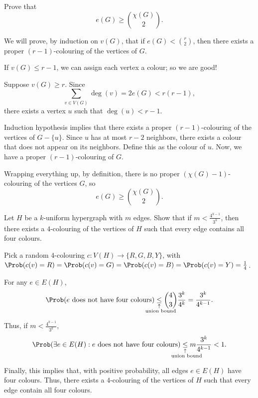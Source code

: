 \documentclass[10pt, a4paper]{article}
\newcommand{\signexpl}[3]{%
  \underset{\substack{\uparrow\\\mathrlap{\text{\hspace{#3}#2}}}}{#1}}
\begin{document}
\newpage
\begin{prob}
	Prove that \[
		e(G) \ge \binom{\chi(G)}{2}.
	\]
\end{prob}
\begin{sol}
	We will prove, by induction on $v(G)$, that if $e(G) < \binom{r}{2}$, then there exists a proper $(r-1)$-colouring of the vertices of $G$.

	If $v(G) \le r-1$, we can assign each vertex a colour; so we are good!

	Suppose $v(G) \ge r$. Since \[\sum_{v \in V(G)}\deg(v) = 2e(G) < r(r-1),\] there exists a vertex $u$ such that $\deg(u) < r-1$.
	
	Induction hypothesis implies that there exists a proper $(r-1)$-colouring of the vertices of $G - \{u\}$. Since $u$ has at most $r-2$ neighbors, there exists a colour that does not appear on its neighbors. Define this as the colour of $u$. Now, we have a proper $(r-1)$-colouring of $G$.

	Wrapping everything up, by definition, there is no proper $(\chi(G) - 1)$-colouring of the vertices $G$, so \[
		e(G) \ge \binom{\chi(G)}{2}.
	\]
\end{sol}

\newpage
\begin{prob}
	Let $H$ be a $k$-uniform hypergraph with $m$ edges. Show that if $m < \frac{4^{k-1}}{3^k}$, then there exists a $4$-colouring of the vertices of $H$ such that every edge contains all four colours.
\end{prob}
\begin{sol}
	Pick a random $4$-colouring $c \colon V(H) \to \{R, G, B, Y\}$, with $\Prob(c(v) = R) = \Prob(c(v) = G) = \Prob(c(v) = B) = \Prob(c(v) = Y) = \frac{1}{4}$.

	For any $e \in E(H)$, \[
		\Prob(e \text{ does not have four colours}) \signexpl{\le}{union bound}{-2.5em} \binom{4}{3} \frac{3^k}{4^k} = \frac{3^k}{4^{k-1}}.
	\]

	Thus, if $m < \frac{4^{k-1}}{3^k}$, \[
		\Prob(\exists e \in E(H) : e \text{ does not have four colours}) \signexpl{\le}{union bound}{-2.5em} m \frac{3^k}{4^{k-1}} < 1.
	\]

	Finally, this implies that, with positive probability, all edges $e \in E(H)$ have four colours. Thus, there exists a $4$-colouring of the vertices of $H$ such that every edge contain all four colours.
\end{sol}
\end{document}
